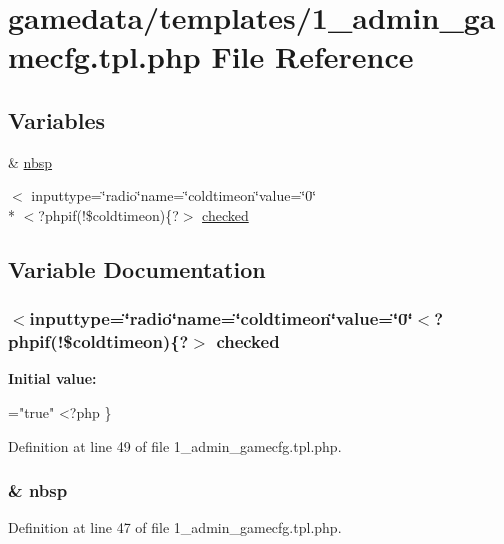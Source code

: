 \hypertarget{1__admin__gamecfg_8tpl_8php}{\section{gamedata/templates/1\+\_\+admin\+\_\+gamecfg.tpl.\+php File Reference}
\label{1__admin__gamecfg_8tpl_8php}
}
\subsection*{Variables}
\begin{DoxyCompactItemize}
\item 
\& \hyperlink{1__admin__gamecfg_8tpl_8php_aef915316f784c9063d942974538301a6}{nbsp}
\item 
$<$ inputtype=\char`\"{}radio\char`\"{}name=\char`\"{}coldtimeon\char`\"{}value=\char`\"{}0\char`\"{}\\*
$<$?phpif(!\$coldtimeon)\{?$>$ \hyperlink{1__admin__gamecfg_8tpl_8php_abf5c495b07b3e2088d2e9366579345e9}{checked}
\end{DoxyCompactItemize}


\subsection{Variable Documentation}
\hypertarget{1__admin__gamecfg_8tpl_8php_abf5c495b07b3e2088d2e9366579345e9}{
\subsubsection[{checked}]{\setlength{\rightskip}{0pt plus 5cm}$<$inputtype=\char`\"{}radio\char`\"{}name=\char`\"{}coldtimeon\char`\"{}value=\char`\"{}0\char`\"{}$<$?phpif(!\$coldtimeon)\{?$>$ checked}}\label{1__admin__gamecfg_8tpl_8php_abf5c495b07b3e2088d2e9366579345e9}
{\bfseries Initial value\+:}
\begin{DoxyCode}
=\textcolor{stringliteral}{"true"}
<?php \}
\end{DoxyCode}


Definition at line 49 of file 1\+\_\+admin\+\_\+gamecfg.\+tpl.\+php.

\hypertarget{1__admin__gamecfg_8tpl_8php_aef915316f784c9063d942974538301a6}{
\subsubsection[{nbsp}]{\setlength{\rightskip}{0pt plus 5cm}\& nbsp}}\label{1__admin__gamecfg_8tpl_8php_aef915316f784c9063d942974538301a6}


Definition at line 47 of file 1\+\_\+admin\+\_\+gamecfg.\+tpl.\+php.

